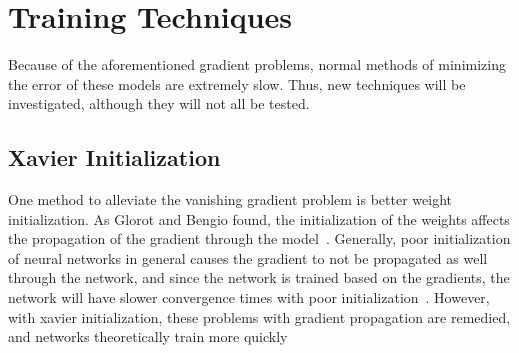 \documentclass[12pt]{article}
\begin{document}


\section{Training Techniques}
Because of the aforementioned gradient problems, normal methods of minimizing
the error of these models are extremely slow. Thus, new techniques will be
investigated, although they will not all be tested.

\subsection{Xavier Initialization}
One method to alleviate the vanishing gradient problem is better weight
initialization. As Glorot and Bengio found, the initialization of the weights
affects the propagation of the gradient through the model~\cite{xavier}.
Generally, poor initialization of neural networks in general causes the gradient
to not be propagated as well through the network, and since the network is
trained based on the gradients, the network will have slower convergence times
with poor initialization~\cite{xavier}. However, with xavier initialization,
these problems with gradient propagation are remedied, and networks
theoretically train more quickly~\cite{xavier}
\end{document}
